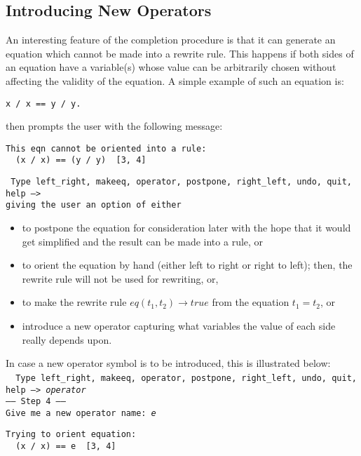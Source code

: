 \subsection{Introducing New Operators}

An interesting feature of the completion procedure is that it can
generate an equation which cannot be made into a rewrite rule. This
happens if both sides of an equation have a variable(s) whose value
can be arbitrarily chosen without affecting the validity of the
equation. A simple example of such an equation is:
\begin{center}
\tt   x / x == y / y.
\end{center}
\RRL then prompts the user with the following
message:
\begin{verbatim}
This eqn cannot be oriented into a rule:
  (x / x) == (y / y)  [3, 4]
\end{verbatim}
\tt 
Type left\_right, makeeq, operator, postpone, right\_left, undo, quit, help -->\\
\rm
giving the user an option of either
\begin{itemize}
\item
to postpone the
equation for consideration later with the hope
that it would get simplified and the result
can be made into a rule, or

\item to orient the equation by hand (either left to right or right to left);
then, the rewrite rule will not be used for rewriting, or,

\item to make the rewrite rule $eq(t_1 , t_2) \rightarrow true$
from the equation $t_1 = t_2$, or

\item introduce a new
operator capturing what variables the value of
each side really depends upon.

\end{itemize}  

In case a new operator symbol is to be introduced, this is illustrated below:\\\
\tt 
Type left\_right, makeeq, operator, postpone, right\_left, undo, quit, help --> {\em operator}\\
----- Step 4 -----\\
Give me a new operator name: {\em e}
\begin{verbatim}
Trying to orient equation: 
  (x / x) == e  [3, 4]
\end{verbatim}
\rm

